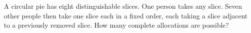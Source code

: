 A circular pie has eight distinguishable slices. One person takes any slice. Seven other people then take one slice each in a fixed order, each taking a slice adjacent to a previously removed slice. How many complete allocations are possible?
